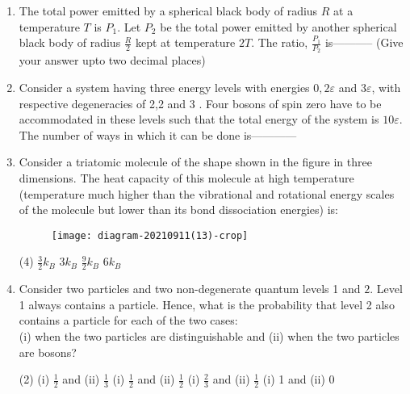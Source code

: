 \begin{enumerate}
	\item The total power emitted by a spherical black body of radius $R$ at a temperature $T$ is $P_{1}$. Let $P_{2}$ be the total power emitted by another spherical black body of radius $\frac{R}{2}$ kept at temperature $2 T$. The ratio, $\frac{P_{1}}{P_{2}}$ is----------- (Give your answer upto two decimal places)
	{}
	
	
	\item Consider a system having three energy levels with energies $0,2 \varepsilon$ and $3 \varepsilon$, with respective degeneracies of 2,2 and 3 . Four bosons of spin zero have to be accommodated in these levels such that the total energy of the system is $10 \varepsilon$. The number of ways in which it can be done is------------
	{}
	
	\item Consider a triatomic molecule of the shape shown in the figure in three dimensions. The heat capacity of this molecule at high temperature (temperature much higher than the vibrational and rotational energy scales of the molecule but lower than its bond dissociation energies) is:
	{}
	\begin{figure}[H]
		\centering
		\texttt{[image: diagram-20210911(13)-crop]}
	\end{figure}
	\begin{tasks}(4)
		\task[\textbf{A.}] $\frac{3}{2} k_{B}$
		\task[\textbf{B.}] $3 k_{B}$
		\task[\textbf{C.}] $\frac{9}{2} k_{B}$
		\task[\textbf{D.}] $6 k_{B}$
	\end{tasks}

	\item Consider two particles and two non-degenerate quantum levels 1 and $2 .$ Level 1 always contains a particle. Hence, what is the probability that level 2 also contains a particle for each of the two cases:\\
	(i) when the two particles are distinguishable and (ii) when the two particles are bosons?
	{}
	\begin{tasks}(2)
		\task[\textbf{A.}] (i) $\frac{1}{2}$ and (ii) $\frac{1}{3}$
		\task[\textbf{B.}] (i) $\frac{1}{2}$ and (ii) $\frac{1}{2}$
		\task[\textbf{C.}] (i) $\frac{2}{3}$ and (ii) $\frac{1}{2}$
		\task[\textbf{D.}] (i) 1 and (ii) 0
	\end{tasks}

\end{enumerate}	
\setlength\arrayrulewidth{1pt}
